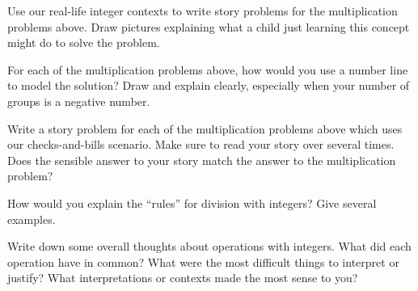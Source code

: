 \documentclass{ximera}
\begin{document}
\begin{question}
Use our real-life integer contexts to write story problems for the multiplication problems above.  Draw pictures explaining what a child just learning this concept might do to solve the problem.

\end{question}

\begin{question}
For each of the multiplication problems above, how would you use a number line to model the solution?  Draw and explain clearly, especially when your number of groups is a negative number.
\end{question}

\begin{question}
Write a story problem for each of the multiplication problems above which uses our checks-and-bills scenario.  Make sure to read your story over several times.  Does the sensible answer to your story match the answer to the multiplication problem?
\end{question}

\begin{question}
How would you explain the ``rules'' for division with integers?  Give several examples.

\end{question}


\begin{question}
Write down some overall thoughts about operations with integers.  What did each operation have in common?  What were the most difficult things to interpret or justify?  What interpretations or contexts made the most sense to you?

\end{question}
\end{document}
